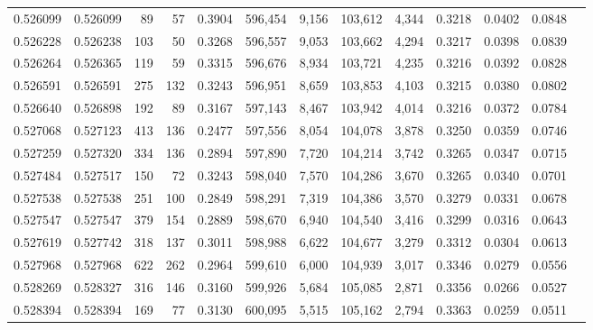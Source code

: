 \begin{tabular}{rrrrrrrrrrrrr}
0.526099 & 0.526099 &    89 &    57 &                                     0.3904 & 596,454 &   9,156 & 103,612 &   4,344 & 0.3218 & 0.0402 & 0.0848 \\
0.526228 & 0.526238 &   103 &    50 &                                     0.3268 & 596,557 &   9,053 & 103,662 &   4,294 & 0.3217 & 0.0398 & 0.0839 \\
0.526264 & 0.526365 &   119 &    59 &                                     0.3315 & 596,676 &   8,934 & 103,721 &   4,235 & 0.3216 & 0.0392 & 0.0828 \\
0.526591 & 0.526591 &   275 &   132 &                                     0.3243 & 596,951 &   8,659 & 103,853 &   4,103 & 0.3215 & 0.0380 & 0.0802 \\
0.526640 & 0.526898 &   192 &    89 &                                     0.3167 & 597,143 &   8,467 & 103,942 &   4,014 & 0.3216 & 0.0372 & 0.0784 \\
0.527068 & 0.527123 &   413 &   136 &                                     0.2477 & 597,556 &   8,054 & 104,078 &   3,878 & 0.3250 & 0.0359 & 0.0746 \\
0.527259 & 0.527320 &   334 &   136 &                                     0.2894 & 597,890 &   7,720 & 104,214 &   3,742 & 0.3265 & 0.0347 & 0.0715 \\
0.527484 & 0.527517 &   150 &    72 &                                     0.3243 & 598,040 &   7,570 & 104,286 &   3,670 & 0.3265 & 0.0340 & 0.0701 \\
0.527538 & 0.527538 &   251 &   100 &                                     0.2849 & 598,291 &   7,319 & 104,386 &   3,570 & 0.3279 & 0.0331 & 0.0678 \\
0.527547 & 0.527547 &   379 &   154 &                                     0.2889 & 598,670 &   6,940 & 104,540 &   3,416 & 0.3299 & 0.0316 & 0.0643 \\
0.527619 & 0.527742 &   318 &   137 &                                     0.3011 & 598,988 &   6,622 & 104,677 &   3,279 & 0.3312 & 0.0304 & 0.0613 \\
0.527968 & 0.527968 &   622 &   262 &                                     0.2964 & 599,610 &   6,000 & 104,939 &   3,017 & 0.3346 & 0.0279 & 0.0556 \\
0.528269 & 0.528327 &   316 &   146 &                                     0.3160 & 599,926 &   5,684 & 105,085 &   2,871 & 0.3356 & 0.0266 & 0.0527 \\
0.528394 & 0.528394 &   169 &    77 &                                     0.3130 & 600,095 &   5,515 & 105,162 &   2,794 & 0.3363 & 0.0259 & 0.0511 \\

\end{tabular}
